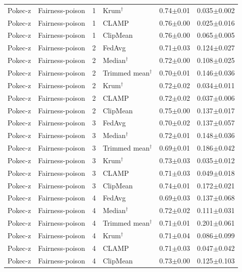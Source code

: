 \begin{longtable}{llclcc}
Pokec-z & Fairness-poison & 1 & Krum$^\dagger$ & 0.74$\pm$0.01 & 0.035$\pm$0.002 \\
Pokec-z & Fairness-poison & 1 & CLAMP & 0.76$\pm$0.00 & 0.025$\pm$0.016 \\
Pokec-z & Fairness-poison & 1 & ClipMean & 0.76$\pm$0.00 & 0.065$\pm$0.005 \\
Pokec-z & Fairness-poison & 2 & FedAvg & 0.71$\pm$0.03 & 0.124$\pm$0.027 \\
Pokec-z & Fairness-poison & 2 & Median$^\dagger$ & 0.72$\pm$0.00 & 0.108$\pm$0.025 \\
Pokec-z & Fairness-poison & 2 & Trimmed mean$^\dagger$ & 0.70$\pm$0.01 & 0.146$\pm$0.036 \\
Pokec-z & Fairness-poison & 2 & Krum$^\dagger$ & 0.72$\pm$0.02 & 0.034$\pm$0.011 \\
Pokec-z & Fairness-poison & 2 & CLAMP & 0.72$\pm$0.02 & 0.037$\pm$0.006 \\
Pokec-z & Fairness-poison & 2 & ClipMean & 0.75$\pm$0.00 & 0.137$\pm$0.017 \\
Pokec-z & Fairness-poison & 3 & FedAvg & 0.70$\pm$0.02 & 0.137$\pm$0.057 \\
Pokec-z & Fairness-poison & 3 & Median$^\dagger$ & 0.72$\pm$0.01 & 0.148$\pm$0.036 \\
Pokec-z & Fairness-poison & 3 & Trimmed mean$^\dagger$ & 0.69$\pm$0.01 & 0.186$\pm$0.042 \\
Pokec-z & Fairness-poison & 3 & Krum$^\dagger$ & 0.73$\pm$0.03 & 0.035$\pm$0.012 \\
Pokec-z & Fairness-poison & 3 & CLAMP & 0.71$\pm$0.03 & 0.049$\pm$0.018 \\
Pokec-z & Fairness-poison & 3 & ClipMean & 0.74$\pm$0.01 & 0.172$\pm$0.021 \\
Pokec-z & Fairness-poison & 4 & FedAvg & 0.69$\pm$0.03 & 0.137$\pm$0.068 \\
Pokec-z & Fairness-poison & 4 & Median$^\dagger$ & 0.72$\pm$0.02 & 0.111$\pm$0.031 \\
Pokec-z & Fairness-poison & 4 & Trimmed mean$^\dagger$ & 0.71$\pm$0.01 & 0.201$\pm$0.061 \\
Pokec-z & Fairness-poison & 4 & Krum$^\dagger$ & 0.71$\pm$0.04 & 0.086$\pm$0.099 \\
Pokec-z & Fairness-poison & 4 & CLAMP & 0.71$\pm$0.03 & 0.047$\pm$0.042 \\
Pokec-z & Fairness-poison & 4 & ClipMean & 0.73$\pm$0.00 & 0.125$\pm$0.103 \\
\end{longtable}
